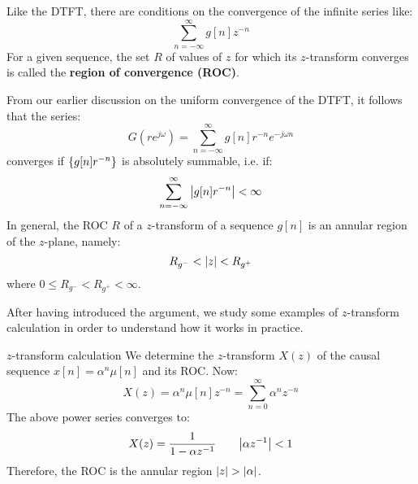 \documentclass[../../main/main.tex]{subfiles}
\begin{document}
Like the DTFT, there are conditions on the convergence of the infinite series like:
\begin{equation}
    \sum_{n=-\infty}^{\infty} g[n] z^{-n}
    \label{eq:L14_S07_1}
\end{equation}
For a given sequence, the set \( R \) of values of \( z \) for which its \( z \)-transform converges is called the \textbf{region of convergence (ROC)}.

From our earlier discussion on the uniform convergence of the DTFT, it follows that the series:
\begin{equation}
    G(re^{j\omega})
    =
    \sum_{n=-\infty}^{\infty} g[n] r^{-n} e^{-j\omega n}
    \label{eq:L14_S08_1}
\end{equation}
converges if \( \qty{g[n]r^{-n}} \) is absolutely summable, i.e. if:
\begin{equation}
    \sum_{n=-\infty}^{\infty} \abs{g[n] r^{-n}}
    <
    \infty
    \label{eq:L14_S08_2}
\end{equation}
In general, the ROC \( R \) of a \( z \)-transform of a sequence \( g[n] \) is an annular region of the \( z \)-plane, namely:
\begin{equation}
    R_{g^{-}}
    <
    \abs{z}
    <
    R_{g^{+}}
    \label{eq:L14_S09_1}
\end{equation}
where \( 0 \le R_{g^{-}} < R_{g^{+}} < \infty \).


\medskip
After having introduced the argument, we study some examples of \( z \)-transform calculation in order to understand how it works in practice.
\begin{example}{\boldmath\( z \)-transform calculation}{}
    We determine the \( z \)-transform \( X(z) \) of the causal sequence \( x[n] = \alpha^{n} \mu[n] \) and its ROC. Now:
    \begin{equation}
        X(z)
        =
        \alpha^{n} \mu[n] z^{-n}
        =
        \sum_{n=0}^{\infty} \alpha^{n} z^{-n}
        \label{eq:L14_S10_1}
    \end{equation}
    The above power series converges to:
    \begin{equation}
        X(z)
        =
        \frac{1}{1 - \alpha z^{-1}}
        \qquad
        \abs{\alpha z^{-1}} < 1
        \label{eq:L14_S10_2}
    \end{equation}
    Therefore, the ROC is the annular region \( \abs{z} > \abs{\alpha} \).
\end{example}
\end{document}
